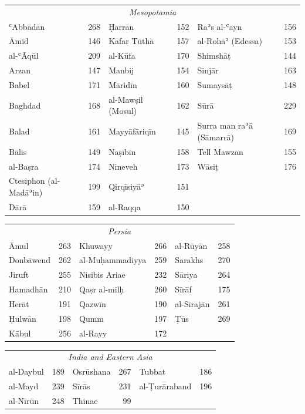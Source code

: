 \documentclass[11pt]{article}
\newcommand{\Pg}[1]{\marginpar{\footnotesize\color{gray}#1}}
\begin{document}
\begin{center}\small\begin{tabular}{lrlrlr}
\multicolumn{6}{c}{\emph{Mesopotamia}} \\
ʿAbbādān & 268 & Ḥarrān & 152 & Raʾs al-ʿayn & 156 \\
Āmid & 146 & Kafar Tūthā & 157 & al-Rohāʾ (Edessa) & 153 \\
al-ʿĀqūl & 209 & al-Kūfa & 170 & Shimshāṭ & 144 \\
Arzan & 147 & Manbij & 154 & Sinjār & 163 \\
Babel & 171 & Māridīn & 160 & Sumaysāṭ & 148 \\
Baghdad & 168 & al-Mawṣil (Mosul) & 162 & Sūrā & 229 \\
Balad & 161 & Mayyāfāriqīn & 145 & Surra man raʾā (Sāmarrā) & 169 \\
Bālis & 149 & Naṣībīn & 158 & Tell Mawzan & 155 \\
al-Baṣra & 174 & Nineveh & 173 & Wāsiṭ & 176 \\
Ctesiphon (al-Madāʾin) & 199 & Qirqīsiyāʾ & 151 &  &  \\
Dārā & 159 & al-Raqqa & 150 &  &  \\
\end{tabular}\end{center}
\Pg{II 215}\begin{center}\small\begin{tabular}{lrlrlr}
\multicolumn{6}{c}{\emph{Persia}} \\
Āmul & 263 & Khuwayy & 266 & al-Rūyān & 258 \\
Donbāwend & 262 & al-Muḥammadiyya & 259 & Sarakhs & 270 \\
Jiruft & 255 & Nisibis Ariae & 232 & Sāriya & 264 \\
Hamadhān & 210 & Qaṣr al-milḥ & 260 & Sīrāf & 175 \\
Herāt & 191 & Qazwīn & 190 & al-Sīrajān & 261 \\
Ḥulwān & 198 & Qumm & 197 & Ṭūs & 269 \\
Kābul & 256 & al-Rayy & 172 &  &  \\
\end{tabular}\end{center}
\begin{center}\small\begin{tabular}{lrlrlr}
\multicolumn{6}{c}{\emph{India and Eastern Asia}} \\
al-Daybul & 189 & Osrūshana & 267 & Tubbat & 186 \\
al-Mayd & 239 & Sīrās & 231 & al-Ṭurāraband & 196 \\
al-Nīrūn & 248 & Thinae & 99 &  &  \\
\end{tabular}\end{center}
\end{document}
